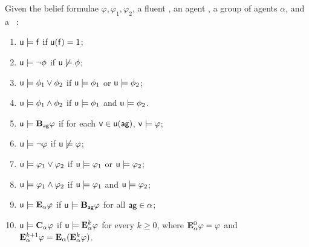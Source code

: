 		\begin{definition}\label{def:poss_truth_fluent}
		Given the belief formulae
	$\varphi,\varphi_{1},\varphi_{2}$, a fluent , an agent , a group of agents $\alpha$, and a \pos\ :
		\begin{enumerate}[label= \emph{(}\roman*\emph{)}]
			\item $\mathsf{u} \models \mathsf{f}$ if $\mathsf{u}(\mathsf{f})= 1$;
			\item $\mathsf{u} \models \neg \phi$ if $\mathsf{u} \not \models \phi$;
			\item $\mathsf{u} \models \phi_1 \vee \phi_2$ if $\mathsf{u} \models
			\phi_1$ or $\mathsf{u} \models \phi_2$;
			\item $\mathsf{u} \models \phi_1 \wedge \phi_2$ if $\mathsf{u} \models
			\phi_1$ and $\mathsf{u} \models \phi_2$.
			\item $\poss{u} \models \bB{ag}{\varphi}$ if for each $\poss{v} \in \possarg{u}{\agent{ag}}$, $\mathsf{v} \models \varphi$;%
			\item $\mathsf{u} \models \neg \varphi$ if $\mathsf{u} \not\models \varphi$;
			\item $\mathsf{u} \models \varphi_1 \vee \varphi_2$ if $\mathsf{u} \models \varphi_1$ or $\mathsf{u}\models \varphi_2$;
			\item $\mathsf{u} \models \varphi_1 \wedge \varphi_2$ if $\mathsf{u} \models \varphi_1$ and $\mathsf{u}\models \varphi_2$;
			\item $\mathsf{u} \models \mathbf{E}_\alpha{\varphi}$ if $\poss{u} \models
			\bB{ag}{\varphi}$ for all $\agent{ag} \in \alpha$;
			\item $\mathsf{u} \models \mathbf{C}_\alpha{\varphi}$ if
			$\mathsf{u} \models \mathbf{E}^{k}_\alpha{\varphi}$ for every
			$k\geq0$, where $\mathbf{E}^{0}_\alpha{\varphi} = \varphi$ and
			$\mathbf{E}^{k+1}_\alpha{\varphi}=\mathbf{E}_\alpha{(\ensuremath{\mathbf{E}^{k}_\alpha{\varphi}})}$.
		\end{enumerate}
	\end{definition}

